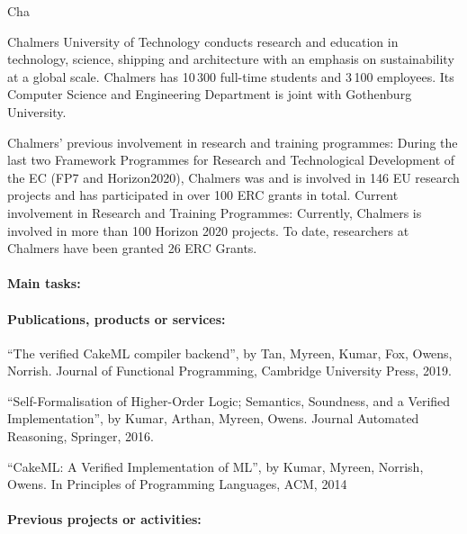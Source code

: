 \begin{sitedescription}{Cha}


Chalmers University of Technology conducts research and education in
technology, science, shipping and architecture with an emphasis on
sustainability at a global scale. Chalmers has 10\,300 full-time
students and 3\,100 employees.  Its Computer Science and Engineering
Department is joint with Gothenburg University.

Chalmers' previous involvement in research and training programmes:
During the last two Framework Programmes for Research and
Technological Development of the EC (FP7 and Horizon2020), Chalmers
was and is involved in 146 EU research projects and has participated
in over 100 ERC grants in total.  Current involvement in Research and
Training Programmes: Currently, Chalmers is involved in more than 100
Horizon 2020 projects.  To date, researchers at Chalmers have been
granted 26 ERC Grants.

\paragraph*{Main tasks:}

\begin{compactitem}
\item{}
\end{compactitem}

\paragraph*{Publications, products or services:}

\begin{compactitem}
\item
  ``The verified CakeML compiler backend'',
  by Tan, Myreen, Kumar, Fox, Owens, Norrish.
  Journal of Functional Programming, Cambridge University Press, 2019.
\item
  ``Self-Formalisation of Higher-Order Logic;
  Semantics, Soundness, and a Verified Implementation'',
  by Kumar, Arthan, Myreen, Owens.
  Journal Automated Reasoning, Springer, 2016.
\item
  ``CakeML: A Verified Implementation of ML'',
  by Kumar, Myreen, Norrish, Owens.
  In Principles of Programming Languages, ACM, 2014
\end{compactitem}

\paragraph*{Previous projects or activities:}


\end{sitedescription}
